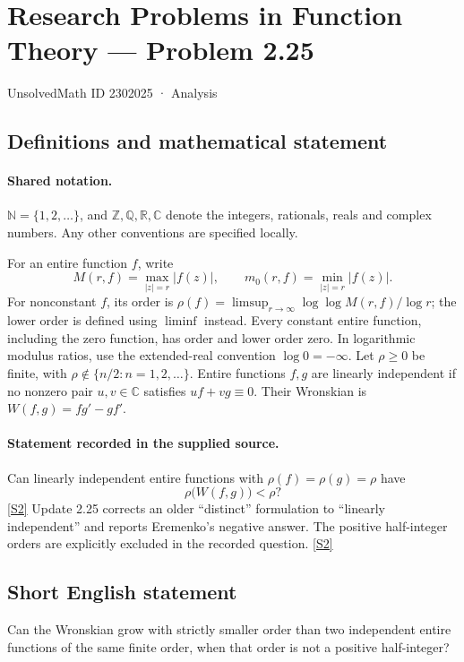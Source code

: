 \documentclass[11pt]{article}
\newcommand{\sref}[2]{\hyperlink{source:#1:#2}{[S#2]}}
\begin{document}
\setcounter{section}{2302024}
\section{Research Problems in Function Theory — Problem 2.25}\label{2302025}
{\small\sffamily UnsolvedMath ID 2302025 · Analysis}
\subsection{Definitions and mathematical statement}

\paragraph{Shared notation.}$\mathbb N=\{1,2,\ldots\}$, and $\mathbb Z,\mathbb Q,\mathbb R,\mathbb C$ denote the integers, rationals, reals and complex numbers. Any other conventions are specified locally.


For an entire function $f$, write
\[
 M(r,f)=\max_{|z|=r}|f(z)|,\qquad m_0(r,f)=\min_{|z|=r}|f(z)|.
\]
For nonconstant $f$, its order is $\rho(f)=\limsup_{r\to\infty}\log\log M(r,f)/\log r$;
the lower order is defined using $\liminf$ instead. Every constant entire function, including the zero function, has order and lower order zero. In logarithmic modulus ratios, use the extended-real convention $\log0=-\infty$.
Let $\rho\ge0$ be finite, with $\rho\notin\{n/2:n=1,2,\ldots\}$. Entire functions $f,g$ are linearly independent if no nonzero pair $u,v\in\mathbb C$ satisfies $uf+vg\equiv0$. Their Wronskian is $W(f,g)=fg'-gf'$.

\paragraph{Statement recorded in the supplied source.}
Can linearly independent entire functions with $\rho(f)=\rho(g)=\rho$ have
\[\rho\bigl(W(f,g)\bigr)<\rho?\] \sref{2302025}{2}
Update 2.25 corrects an older ``distinct'' formulation to ``linearly independent'' and reports Eremenko's negative answer. The positive half-integer orders are explicitly excluded in the recorded question. \sref{2302025}{2}
\subsection{Short English statement}
Can the Wronskian grow with strictly smaller order than two independent entire functions of the same finite order, when that order is not a positive half-integer?
\end{document}
